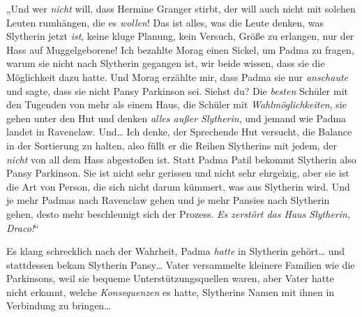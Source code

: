 „Und wer \emph{nicht} will, dass Hermine Granger stirbt, der will auch nicht mit solchen Leuten rumhängen, die es \emph{wollen}! Das ist alles, was die Leute denken, was Slytherin jetzt \emph{ist}, keine kluge Planung, kein Versuch, Größe zu erlangen, nur der Hass auf Muggelgeborene! Ich bezahlte Morag einen Sickel, um Padma zu fragen, warum sie nicht nach Slytherin gegangen ist, wir beide wissen, dass sie die Möglichkeit dazu hatte. Und Morag erzählte mir, dass Padma sie nur \emph{anschaute} und sagte, dass sie nicht Pansy Parkinson sei. Siehst du? Die \emph{besten} Schüler mit den Tugenden von mehr als einem Haus, die Schüler mit \emph{Wahlmöglichkeiten}, sie gehen unter den Hut und denken \emph{alles außer Slytherin}, und jemand wie Padma landet in Ravenclaw. Und… Ich denke, der Sprechende Hut versucht, die Balance in der Sortierung zu halten, also füllt er die Reihen Slytherins mit jedem, der \emph{nicht} von all dem Hass abgestoßen ist. Statt Padma Patil bekommt Slytherin also Pansy Parkinson. Sie ist nicht sehr gerissen und nicht sehr ehrgeizig, aber sie ist die Art von Person, die sich nicht darum kümmert, was aus Slytherin wird. Und je mehr Padmas nach Ravenclaw gehen und je mehr Pansies nach Slytherin gehen, desto mehr beschleunigt sich der Prozess. \emph{Es zerstört das Haus Slytherin, Draco!}“

Es klang schrecklich nach der Wahrheit, Padma \emph{hatte} in Slytherin gehört… und stattdessen bekam Slytherin Pansy… Vater versammelte kleinere Familien wie die Parkinsons, weil sie bequeme Unterstützungsquellen waren, aber Vater hatte nicht erkannt, welche \emph{Konsequenzen} es hatte, Slytherins Namen mit ihnen in Verbindung zu bringen…

